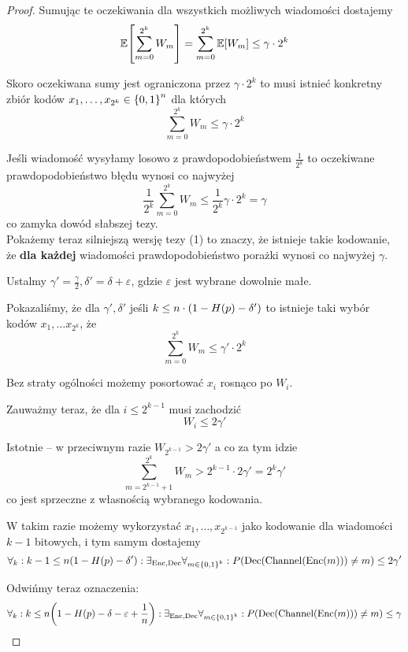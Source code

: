 \begin{proof}
	Sumując te oczekiwania dla wszystkich możliwych wiadomości dostajemy
	\[
		\expected{\sum_{m=0}^{2^k} W_m} = \sum_{m=0}^{2^k} \expected{W_m} \leq \gamma \cdot 2^k
	\]

	Skoro oczekiwana sumy jest ograniczona przez \( \gamma \cdot 2^k \)
	to musi istnieć konkretny zbiór kodów \( x_1, \dots, x_{2^k} \in \set{0, 1}^n \) dla których
	\[
		\sum_{m=0}^{2^k} W_m \leq \gamma \cdot 2^k
	\]

	Jeśli wiadomość wysyłamy losowo z prawdopodobieństwem \( \frac{1}{2^k} \) to oczekiwane prawdopodobieństwo błędu wynosi co najwyżej
	\[
		\frac{1}{2^k} \sum_{m=0}^{2^k} W_m \leq \frac{1}{2^k} \gamma \cdot 2^k = \gamma
	\]
	co zamyka dowód słabszej tezy. \\

	Pokażemy teraz silniejszą wersję tezy (1) to znaczy, że istnieje takie kodowanie,
	że \textbf{dla każdej} wiadomości prawdopodobieństwo porażki wynosi co najwyżej \( \gamma \).

	Ustalmy \( \gamma' = \frac{\gamma}{2}, \delta' = \delta + \varepsilon \), gdzie \( \varepsilon \)
	jest wybrane dowolnie małe.

	Pokazaliśmy, że dla \( \gamma', \delta' \) jeśli \( k \leq n \cdot \left(1 - H(p) - \delta'\right) \)
	to istnieje taki wybór kodów \( x_1, \dots x_{2^k} \), że
	\[
		\sum_{m=0}^{2^k} W_m \leq \gamma' \cdot 2^k
	\]

	Bez straty ogólności możemy posortować \( x_i \) rosnąco po \( W_i \).

	Zauważmy teraz, że dla \( i \leq 2^{k-1} \) musi zachodzić
	\[
		W_i \leq 2\gamma'
	\]

	Istotnie -- w przeciwnym razie \( W_{2^{k-1}} > 2\gamma' \) a co za tym idzie
	\[
		\sum_{m=2^{k-1}+1}^{2^k} W_m > 2^{k-1} \cdot 2\gamma' = 2^k \gamma'
	\]
	co jest sprzeczne z własnością wybranego kodowania.

	W takim razie możemy wykorzystać \( x_1, \dots, x_{2^{k-1}} \) jako kodowanie dla wiadomości \( k - 1 \) bitowych, i tym samym dostajemy
	\begin{multline*}
		\forall_k :  k - 1 \leq n \pars{1 - H(p) - \delta'}:
		\exists_{\Enc, \Dec} \forall_{m \in \set{0, 1}^k} :
		P\pars{\Dec(\Channel(\Enc(m))) \neq m} \leq 2\gamma'
	\end{multline*}

	Odwińmy teraz oznaczenia:
	\begin{multline*}
		\forall_k :  k \leq n \pars{1 - H(p) - \delta - \varepsilon + \frac{1}{n}}:
		\exists_{\Enc, \Dec} \forall_{m \in \set{0, 1}^k} :
		P\pars{\Dec(\Channel(\Enc(m))) \neq m} \leq \gamma
	\end{multline*}


\end{proof}
